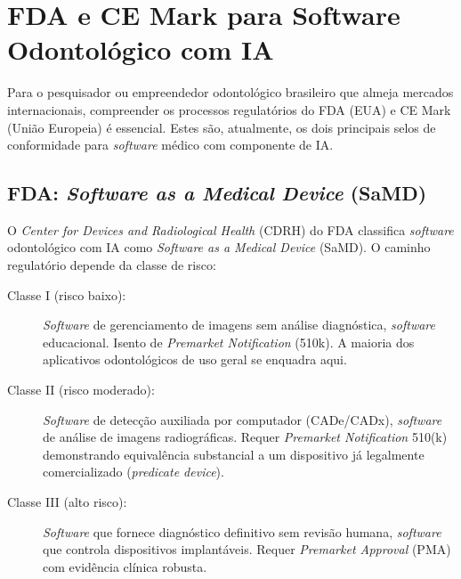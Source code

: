 

\section{FDA e CE Mark para Software Odontológico com IA}
\label{sec:fda-ce-mark}

\nivelcinco

Para o pesquisador ou empreendedor odontológico brasileiro que almeja
mercados internacionais, compreender os processos regulatórios do FDA (EUA) e
CE Mark (União Europeia) é essencial. Estes são, atualmente, os dois principais
selos de conformidade para \textit{software} médico com componente de IA.

 

\subsection{FDA: \textit{Software as a Medical Device} (SaMD)}

O \textit{Center for Devices and Radiological Health} (CDRH) do FDA classifica
\textit{software} odontológico com IA como \textit{Software as a Medical Device}
(SaMD). O caminho regulatório depende da classe de risco:

\begin{description}
  \item[Classe I (risco baixo):] \textit{Software} de gerenciamento de imagens
    sem análise diagnóstica, \textit{software} educacional. Isento de
    \textit{Premarket Notification} (510k). A maioria dos aplicativos
    odontológicos de uso geral se enquadra aqui.

  \item[Classe II (risco moderado):] \textit{Software} de detecção auxiliada
    por computador (CADe/CADx), \textit{software} de análise de imagens
    radiográficas. Requer \textit{Premarket Notification} 510(k) demonstrando
    equivalência substancial a um dispositivo já legalmente comercializado
    (\textit{predicate device}).

  \item[Classe III (alto risco):] \textit{Software} que fornece diagnóstico
    definitivo sem revisão humana, \textit{software} que controla dispositivos
    implantáveis. Requer \textit{Premarket Approval} (PMA) com evidência
    clínica robusta.
\end{description}

